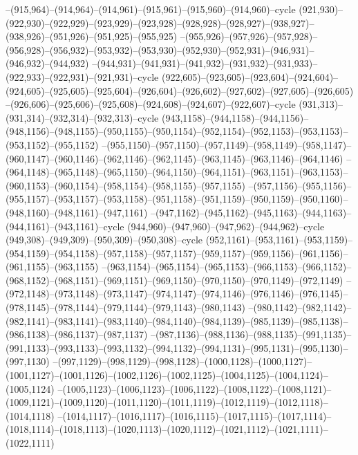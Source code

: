 --(915,964)--(914,964)--(914,961)--(915,961)--(915,960)--(914,960)--cycle
(921,930)--(922,930)--(922,929)--(923,929)--(923,928)--(928,928)--(928,927)--(938,927)--(938,926)--(951,926)--(951,925)--(955,925)
--(955,926)--(957,926)--(957,928)--(956,928)--(956,932)--(953,932)--(953,930)--(952,930)--(952,931)--(946,931)--(946,932)--(944,932)
--(944,931)--(941,931)--(941,932)--(931,932)--(931,933)--(922,933)--(922,931)--(921,931)--cycle
(922,605)--(923,605)--(923,604)--(924,604)--(924,605)--(925,605)--(925,604)--(926,604)--(926,602)--(927,602)--(927,605)--(926,605)
--(926,606)--(925,606)--(925,608)--(924,608)--(924,607)--(922,607)--cycle
(931,313)--(931,314)--(932,314)--(932,313)--cycle
(943,1158)--(944,1158)--(944,1156)--(948,1156)--(948,1155)--(950,1155)--(950,1154)--(952,1154)--(952,1153)--(953,1153)--(953,1152)--(955,1152)
--(955,1150)--(957,1150)--(957,1149)--(958,1149)--(958,1147)--(960,1147)--(960,1146)--(962,1146)--(962,1145)--(963,1145)--(963,1146)--(964,1146)
--(964,1148)--(965,1148)--(965,1150)--(964,1150)--(964,1151)--(963,1151)--(963,1153)--(960,1153)--(960,1154)--(958,1154)--(958,1155)--(957,1155)
--(957,1156)--(955,1156)--(955,1157)--(953,1157)--(953,1158)--(951,1158)--(951,1159)--(950,1159)--(950,1160)--(948,1160)--(948,1161)--(947,1161)
--(947,1162)--(945,1162)--(945,1163)--(944,1163)--(944,1161)--(943,1161)--cycle
(944,960)--(947,960)--(947,962)--(944,962)--cycle
(949,308)--(949,309)--(950,309)--(950,308)--cycle
(952,1161)--(953,1161)--(953,1159)--(954,1159)--(954,1158)--(957,1158)--(957,1157)--(959,1157)--(959,1156)--(961,1156)--(961,1155)--(963,1155)
--(963,1154)--(965,1154)--(965,1153)--(966,1153)--(966,1152)--(968,1152)--(968,1151)--(969,1151)--(969,1150)--(970,1150)--(970,1149)--(972,1149)
--(972,1148)--(973,1148)--(973,1147)--(974,1147)--(974,1146)--(976,1146)--(976,1145)--(978,1145)--(978,1144)--(979,1144)--(979,1143)--(980,1143)
--(980,1142)--(982,1142)--(982,1141)--(983,1141)--(983,1140)--(984,1140)--(984,1139)--(985,1139)--(985,1138)--(986,1138)--(986,1137)--(987,1137)
--(987,1136)--(988,1136)--(988,1135)--(991,1135)--(991,1133)--(993,1133)--(993,1132)--(994,1132)--(994,1131)--(995,1131)--(995,1130)--(997,1130)
--(997,1129)--(998,1129)--(998,1128)--(1000,1128)--(1000,1127)--(1001,1127)--(1001,1126)--(1002,1126)--(1002,1125)--(1004,1125)--(1004,1124)--(1005,1124)
--(1005,1123)--(1006,1123)--(1006,1122)--(1008,1122)--(1008,1121)--(1009,1121)--(1009,1120)--(1011,1120)--(1011,1119)--(1012,1119)--(1012,1118)--(1014,1118)
--(1014,1117)--(1016,1117)--(1016,1115)--(1017,1115)--(1017,1114)--(1018,1114)--(1018,1113)--(1020,1113)--(1020,1112)--(1021,1112)--(1021,1111)--(1022,1111)
